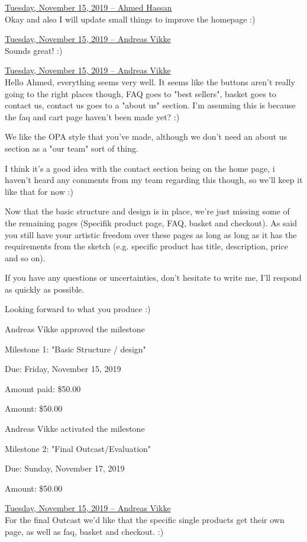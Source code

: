 \documentclass[11pt]{report}
\begin{document}
\noindent\underline{Tuesday, November 15, 2019 – Ahmed Hassan}\\
\noindent Okay and also I will update small things to improve the homepage :)

\noindent\underline{Tuesday, November 15, 2019 – Andreas Vikke}\\
\noindent Sounds great! :)

\noindent\underline{Tuesday, November 15, 2019 – Andreas Vikke}\\
\noindent Hello Ahmed, everything seems very well. It seems like the buttons aren't really going to the right places though, FAQ goes to "best sellers", basket goes to contact us, contact us goes to a "about us" section. I'm assuming this is because the faq and cart page haven't been made yet? :)

\noindent We like the OPA style that you've made, although we don't need an about us section as a "our team" sort of thing.

\noindent I think it's a good idea with the contact section being on the home page, i haven't heard any comments from my team regarding this though, so we'll keep it like that for now :)

\noindent Now that the basic structure and design is in place, we're just missing some of the remaining pages (Specifik product page, FAQ, basket and checkout). As said you still have your artistic freedom over these pages as long as long as it has the requirements from the sketch (e.g. specific product has title, description, price and so on).

\noindent If you have any questions or uncertainties, don't hesitate to write me, I'll respond as quickly as possible.

\noindent Looking forward to what you produce :)

\noindent Andreas Vikke approved the milestone

Milestone 1: "Basic Structure / design"

Due: Friday, November 15, 2019

Amount paid: \$50.00

Amount: \$50.00

\noindent Andreas Vikke activated the milestone

Milestone 2: "Final Outcast/Evaluation"

Due: Sunday, November 17, 2019

Amount: \$50.00

\noindent\underline{Tuesday, November 15, 2019 – Andreas Vikke}\\
\noindent For the final Outcast we'd like that the specific single products get their own page, as well as faq, basket and checkout. :)
\end{document}
